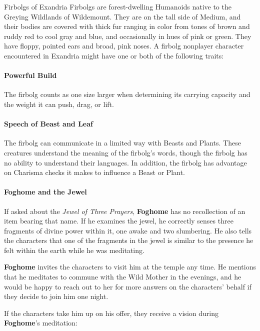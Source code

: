 \documentclass[a4paper, 11pt, bg=full, twocolumn, nooutline]{dndbook}
\begin{document}
\begin{DndSidebar}{Firbolgs of Exandria}
Firbolgs are forest-dwelling Humanoids native to the Greying Wildlands of Wildemount. They are on the tall side of Medium, and their bodies are covered with thick fur ranging in color from tones of brown and ruddy red to cool gray and blue, and occasionally in hues of pink or green. They have floppy, pointed ears and broad, pink noses.
A firbolg nonplayer character encountered in Exandria might have one or both of the following traits:
\paragraph{Powerful Build}

The firbolg counts as one size larger when determining its carrying capacity and the weight it can push, drag, or lift.
\paragraph{Speech of Beast and Leaf}

The firbolg can communicate in a limited way with Beasts and Plants. These creatures understand the meaning of the firbolg's words, though the firbolg has no ability to understand their languages. In addition, the firbolg has advantage on Charisma checks it makes to influence a Beast or Plant.
\end{DndSidebar}

\paragraph{Foghome and the Jewel}

If asked about the \textit{Jewel of Three Prayers}, \textbf{Foghome} has no recollection of an item bearing that name. If he examines the jewel, he correctly senses three fragments of divine power within it, one awake and two slumbering. He also tells the characters that one of the fragments in the jewel is similar to the presence he felt within the earth while he was meditating.

\textbf{Foghome} invites the characters to visit him at the temple any time. He mentions that he meditates to commune with the Wild Mother in the evenings, and he would be happy to reach out to her for more answers on the characters' behalf if they decide to join him one night.

If the characters take him up on his offer, they receive a vision during \textbf{Foghome}'s meditation:
\end{document}

